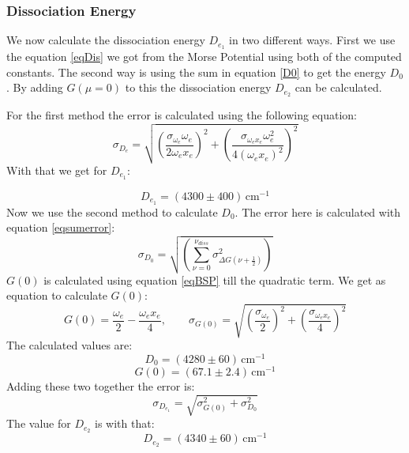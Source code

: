 \subsubsection{Dissociation Energy}
We now calculate the dissociation energy $D_{e_1}$ in two different ways. First we use the equation \ref{eqDis} we got from the Morse Potential using both of the computed constants. The second way is using the sum in equation \ref{D0} to get the energy $D_0$. By adding $G(\mu=0)$ to this the dissociation energy $D_{e_2}$ can be calculated.\par
For the first method the error is calculated using the following equation:
\begin{equation}
	\sigma_{D_e}=\sqrt{\left(\frac{\sigma_{\omega_e}\omega_e}{2\omega_ex_e}\right)^2+\left(\frac{\sigma_{\omega_ex_e}\omega_e^2}{4(\omega_ex_e)^2}\right)^2}
\end{equation}
With that we get for $D_{e_1}$:\par
\begin{equation*}
	D_{e_1}=(4300\pm 400)\,\text{cm}^{-1}
\end{equation*}
Now we use the second method to calculate $D_0$. The error here is calculated with equation \ref{eqsumerror}:
\begin{equation}
	\sigma_{D_0}=\sqrt{\left(\sum_{\nu=0}^{\nu_{diss}}\sigma_{\Delta G (\nu+\frac{1}{2})}^2\right)}
	\label{eqsumerror}
\end{equation}
$G(0)$ is calculated using equation \ref{eqBSP} till the quadratic term. We get as equation to calculate $G(0)$:
\begin{equation}
	G(0)=\frac{\omega_e}{2}-\frac{\omega_ex_e}{4}, \qquad \sigma_{G(0)}=\sqrt{\left(\frac{\sigma_{\omega_e}}{2}\right)^2+\left(\frac{\sigma_{\omega_ex_e}}{4}\right)^2}
\end{equation}
The calculated values are:
\begin{equation*}
	D_0=(4280\pm 60)\,\text{cm}^{-1}
\end{equation*}
\begin{equation*}
G(0)=(67.1\pm 2.4)\,\text{cm}^{-1}
\end{equation*}
Adding these two together the error is:
\begin{equation}
	\sigma_{D_{e_1}}=\sqrt{\sigma_{G(0)}^2+\sigma_{D_0}^2}
\end{equation}
The value for $D_{e_2}$ is with that:
\begin{equation*}
	D_{e_2}=(4340\pm 60)\,\text{cm}^{-1}
\end{equation*}
